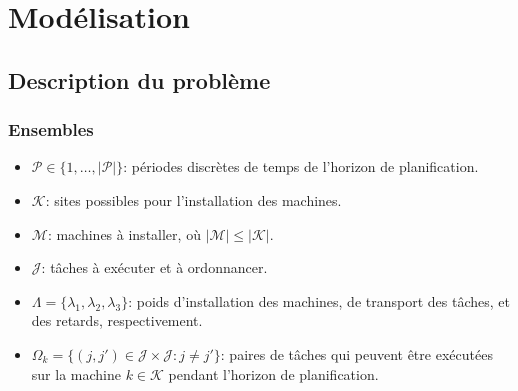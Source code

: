 \section{Modélisation} \label{sec:modelisation}

\subsection{Description du problème}

\subsubsection{Ensembles}
\begin{itemize}
    \item \(\mathcal{P} \in \{1, \dots, |\mathcal{P}|\}\): périodes discrètes de temps de l'horizon de planification.
    \item \(\mathcal{K}\): sites possibles pour l'installation des machines.
    \item \(\mathcal{M}\): machines à installer, où \(|\mathcal{M}| \leq |\mathcal{K}|\).
    \item \(\mathcal{J}\): tâches à exécuter et à ordonnancer.
    \item \(\Lambda = \{\lambda_{1}, \lambda_{2}, \lambda_{3}\}\): poids d'installation des machines, de transport des tâches, et des retards, respectivement.
    \item \(\Omega_{k} = \{(j, j') \in \mathcal{J} \times \mathcal{J} : j \neq j'\}\): paires de tâches qui peuvent être exécutées sur la machine \(k \in \mathcal{K}\) pendant l'horizon de planification.
\end{itemize}

